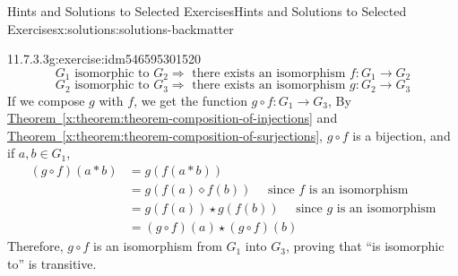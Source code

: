 \documentclass[oneside,10pt,]{book}
\newcommand{\blocktitlefont}{\relax}
\newcommand{\xreffont}{\relax}
\numberwithin{equation}{section}
\begin{document}
\begin{solutions-chapter}{Hints and Solutions to Selected Exercises}{}{Hints and Solutions to Selected Exercises}{}{}{x:solutions:solutions-backmatter}
\begin{divisionsolution}{11.7.3.3}{}{g:exercise:idm546595301520}
\begin{equation*}
G_1 \textrm{ isomorphic} \textrm{ to } G_2\Rightarrow  \textrm{ there} \textrm{ exists} \textrm{ an} \textrm{ isomorphism } f:G_1\to G_2
\end{equation*}
%
\begin{equation*}
G_2 \textrm{ isomorphic} \textrm{ to } G_3\Rightarrow  \textrm{ there} \textrm{ exists} \textrm{ an} \textrm{ isomorphism } g:G_2\to G_3
\end{equation*}
If we compose \(g\) with \(f\), we get the function \(g\circ f:G_1\to G_3\),  By \hyperref[x:theorem:theorem-composition-of-injections]{Theorem~{\xreffont\ref{x:theorem:theorem-composition-of-injections}}} and \hyperref[x:theorem:theorem-composition-of-surjections]{Theorem~{\xreffont\ref{x:theorem:theorem-composition-of-surjections}}}, \(g\circ f\) is a bijection, and if \(a,b\in G_1\),%
\begin{equation*}
\begin{split}
(g\circ f)(a*b) &=g(f(a*b))\\
&=g(f(a)\diamond f(b))\quad  \textrm{ since } f \textrm{ is an isomorphism}\\
& =g(f(a))\star g(f(b))\quad \textrm{ since } g \textrm{ is an isomorphism}\\
& =(g\circ f)(a) \star (g\circ f)(b)
\end{split}
\end{equation*}
Therefore, \(g\circ f\) is an isomorphism from \(G_1\) into \(G_3\), proving that ``is isomorphic to'' is transitive.%
\end{divisionsolution}%
%
\end{solutions-chapter}
\end{document}
